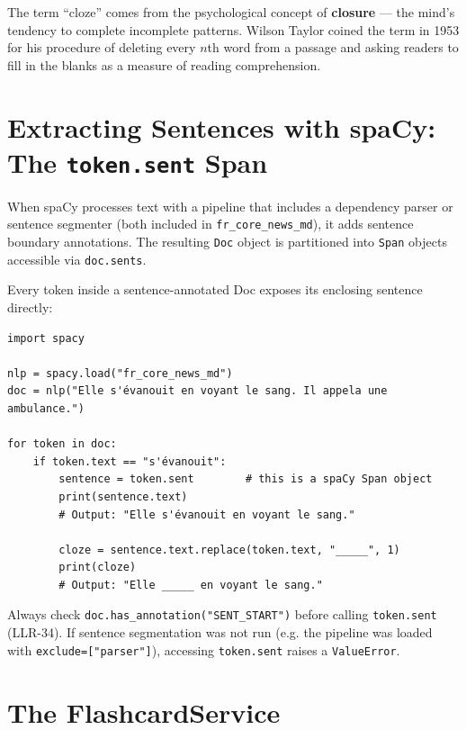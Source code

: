 \documentclass[12pt,oneside]{book}
\begin{document}
\begin{notebox}
The term ``cloze'' comes from the psychological concept of \textbf{closure} —
the mind's tendency to complete incomplete patterns. Wilson Taylor coined the term
in 1953 for his procedure of deleting every $n$th word from a passage and asking
readers to fill in the blanks as a measure of reading comprehension.
\end{notebox}

\section{Extracting Sentences with spaCy: The \texttt{token.sent} Span}

When spaCy processes text with a pipeline that includes a dependency parser or sentence
segmenter (both included in \texttt{fr\_core\_news\_md}), it adds sentence boundary
annotations. The resulting \texttt{Doc} object is partitioned into \texttt{Span} objects
accessible via \texttt{doc.sents}.

Every token inside a sentence-annotated Doc exposes its enclosing sentence directly:

\begin{lstlisting}[caption={Extracting a sentence from a spaCy token (LLR-25)}]
import spacy

nlp = spacy.load("fr_core_news_md")
doc = nlp("Elle s'évanouit en voyant le sang. Il appela une ambulance.")

for token in doc:
    if token.text == "s'évanouit":
        sentence = token.sent        # this is a spaCy Span object
        print(sentence.text)
        # Output: "Elle s'évanouit en voyant le sang."

        cloze = sentence.text.replace(token.text, "_____", 1)
        print(cloze)
        # Output: "Elle _____ en voyant le sang."
\end{lstlisting}

\begin{warnbox}
Always check \texttt{doc.has\_annotation("SENT\_START")} before calling
\texttt{token.sent} (LLR-34). If sentence segmentation was not run (e.g.
the pipeline was loaded with \texttt{exclude=["parser"]}), accessing
\texttt{token.sent} raises a \texttt{ValueError}.
\end{warnbox}

\section{The FlashcardService}
\end{document}
